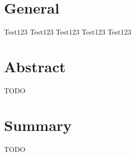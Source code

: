 \documentclass[
	bibliography=totoc,
	listof=totoc,
]{scrbook}
\begin{document}
\frontmatter %
\section*{General} %


\begin{marker}\begin{itemize}
    \todoItem Test123
    \improveItem Test123
    \finalizeItem Test123
    \doneItem Test123
    \noteItem Test123
\end{itemize}\end{marker}


\vfill\pagebreak %
\section*{Abstract} %


\begin{marker}\begin{justify}
TODO
\end{justify}\end{marker}


\section*{Summary} %


\begin{marker}\begin{justify}
TODO
\end{justify}\end{marker}
\end{document}
